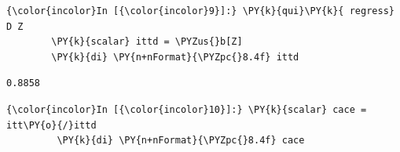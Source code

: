 \documentclass[11pt,notitlepage]{article}\usepackage[]{graphicx}\usepackage[]{color}
\makeatletter
\newenvironment{kframe}{%
 \def\at@end@of@kframe{}%
 \ifinner\ifhmode%
  \def\at@end@of@kframe{\end{minipage}}%
  \begin{minipage}{\columnwidth}%
 \fi\fi%
 \def\FrameCommand##1{\hskip\@totalleftmargin \hskip-\fboxsep
 \colorbox{shadecolor}{##1}\hskip-\fboxsep
     \hskip-\linewidth \hskip-\@totalleftmargin \hskip\columnwidth}%
 \MakeFramed {\advance\hsize-\width
   \@totalleftmargin\z@ \linewidth\hsize
   \@setminipage}}%
 {\par\unskip\endMakeFramed%
 \at@end@of@kframe}
\newenvironment{knitrout}{}{} %
\makeatother
\begin{document}
\begin{enumerate}[a)]
\begin{knitrout}
\begin{kframe}
    \begin{Verbatim}[commandchars=\\\{\}]
{\color{incolor}In [{\color{incolor}9}]:} \PY{k}{qui}\PY{k}{ regress} D Z
        \PY{k}{scalar} ittd = \PYZus{}b[Z]
        \PY{k}{di} \PY{n+nFormat}{\PYZpc{}8.4f} ittd
\end{Verbatim}

    \begin{Verbatim}[commandchars=\\\{\}]
  0.8858
    \end{Verbatim}

    \begin{Verbatim}[commandchars=\\\{\}]
{\color{incolor}In [{\color{incolor}10}]:} \PY{k}{scalar} cace = itt\PY{o}{/}ittd
         \PY{k}{di} \PY{n+nFormat}{\PYZpc{}8.4f} cace
\end{Verbatim}


\end{kframe}
\end{knitrout}
\end{enumerate}
\end{document}
